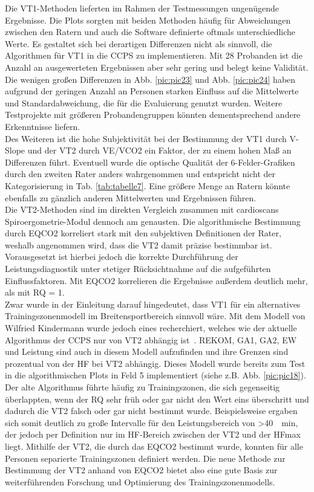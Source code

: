 Die VT1-Methoden lieferten im Rahmen der Testmessungen ungenügende Ergebnisse. Die Plots sorgten mit beiden Methoden häufig für Abweichungen zwischen den Ratern und auch die Software definierte oftmals unterschiedliche Werte. Es gestaltet sich bei derartigen Differenzen nicht als sinnvoll, die Algorithmen für VT1 in die \acs{CCPS} zu implementieren. Mit 28 Probanden ist die Anzahl an ausgewerteten Ergebnissen aber sehr gering und belegt keine Validität. Die wenigen großen Differenzen in Abb. \ref{pic:pic23} und Abb. \ref{pic:pic24} haben aufgrund der geringen Anzahl an Personen starken Einfluss auf die Mittelwerte und Standardabweichung, die für die Evaluierung genutzt wurden. Weitere Testprojekte mit größeren Probandengruppen könnten dementsprechend andere Erkenntnisse liefern.\\
Des Weiteren ist die hohe Subjektivität bei der Bestimmung der VT1 durch V-Slope und der VT2 durch \acs{VE}/\acs{VCO2} ein Faktor, der zu einem hohen Maß an Differenzen führt. Eventuell wurde die optische Qualität der 6-Felder-Grafiken durch den zweiten Rater anders wahrgenommen und entspricht nicht der Kategorisierung in Tab. \ref{tab:tabelle7}. Eine größere Menge an Ratern könnte ebenfalls zu gänzlich anderen Mittelwerten und Ergebnissen führen.\\
Die VT2-Methoden sind im direkten Vergleich zusammen mit cardioscans Spiroergometrie-Modul dennoch am genausten. Die algorithmische Bestimmung durch \acs{EQCO2} korreliert stark mit den subjektiven Definitionen der Rater, weshalb angenommen wird, dass die VT2 damit präzise bestimmbar ist. Vorausgesetzt ist hierbei jedoch die korrekte Durchführung der Leistungsdiagnostik unter stetiger Rücksichtnahme auf die aufgeführten Einflussfaktoren. Mit \acs{EQCO2} korrelieren die Ergebnisse außerdem deutlich mehr, als mit RQ = 1.\\
Zwar wurde in der Einleitung darauf hingedeutet, dass VT1 für ein alternatives Trainingszonenmodell im Breitensportbereich sinnvoll wäre. Mit dem Modell von Wilfried Kindermann wurde jedoch eines recherchiert, welches wie der aktuelle Algorithmus der \acs{CCPS} nur von VT2 abhängig ist~\cite{Kindermann.2004}. \acs{REKOM}, \acs{GA1}, \acs{GA2}, \acs{EW} und Leistung sind auch in diesem Modell aufzufinden und ihre Grenzen sind prozentual von der \acs{HF} bei VT2 abhängig. Dieses Modell wurde bereits zum Test in die algorithmischen Plots in Feld 5 implementiert (siehe z.B. Abb. \ref{pic:pic18}). Der alte Algorithmus führte häufig zu Trainingszonen, die sich gegenseitig überlappten, wenn der RQ sehr früh oder gar nicht den Wert eins überschritt und dadurch die VT2 falsch oder gar nicht bestimmt wurde. Beispielsweise ergaben sich somit deutlich zu große Intervalle für den Leistungsbereich von >\SI{40}{\per\minute}, der jedoch per Definition nur im \acs{HF}-Bereich zwischen der VT2 und der \acs{HFmax} liegt. Mithilfe der VT2, die durch das \acs{EQCO2} bestimmt wurde, konnten für alle Personen separierte Trainingszonen definiert werden. Die neue Methode zur Bestimmung der VT2 anhand von \acs{EQCO2} bietet also eine gute Basis zur weiterführenden Forschung und Optimierung des Trainingszonenmodells.

